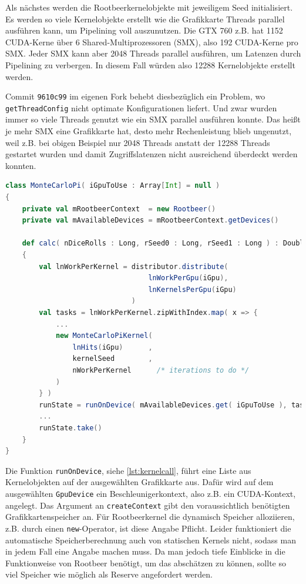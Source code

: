 Als nächstes werden die Rootbeerkernelobjekte mit jeweiligem Seed initialisiert. Es werden so viele Kernelobjekte erstellt wie die Grafikkarte Threads parallel ausführen kann, um Pipelining voll auszunutzen.
Die GTX 760 z.B. hat 1152 CUDA-Kerne über 6 Shared-Multiprozessoren (SMX), also 192 CUDA-Kerne pro SMX. Jeder SMX kann aber 2048 Threads parallel ausführen, um Latenzen durch Pipelining zu verbergen. In diesem Fall würden also 12288 Kernelobjekte erstellt werden.

Commit \lstinline!9610c99! im eigenen Fork behebt diesbezüglich ein Problem, wo \lstinline!getThreadConfig! nicht optimate Konfigurationen liefert. Und zwar wurden immer so viele Threads genutzt wie ein SMX parallel ausführen konnte. Das heißt je mehr SMX eine Grafikkarte hat, desto mehr Rechenleistung blieb ungenutzt, weil z.B. bei obigen Beispiel nur 2048 Threads anstatt der 12288 Threads gestartet wurden und damit Zugriffslatenzen nicht ausreichend überdeckt werden konnten.

\begin{lstlisting}[language=scala,caption={Initialisierung der Rootbeerkernelobjekte, vgl. auch \lstinline!multiNode/multiGpu/scala/MonteCarloPi.scala! \cite{scaromare}},label=lst:kernelinit]
class MonteCarloPi( iGpuToUse : Array[Int] = null )
{
    private val mRootbeerContext  = new Rootbeer()
    private val mAvailableDevices = mRootbeerContext.getDevices()

    def calc( nDiceRolls : Long, rSeed0 : Long, rSeed1 : Long ) : Double =
    {
        val lnWorkPerKernel = distributor.distribute(
                                  lnWorkPerGpu(iGpu),
                                  lnKernelsPerGpu(iGpu)
                              )
        val tasks = lnWorkPerKernel.zipWithIndex.map( x => {
            ...
            new MonteCarloPiKernel(
                lnHits(iGpu)      ,
                kernelSeed        ,
                nWorkPerKernel      /* iterations to do */
            )
        } )
        runState = runOnDevice( mAvailableDevices.get( iGpuToUse ), tasks )
        ...
        runState.take()
    }
}
\end{lstlisting}


Die Funktion \lstinline!runOnDevice!, siehe \autoref{lst:kernelcall}, führt eine Liste aus Kernelobjekten auf der ausgewählten Grafikkarte aus.
Dafür wird auf dem ausgewählten \lstinline!GpuDevice! ein Beschleunigerkontext, also z.B. ein CUDA-Kontext, angelegt. Das Argument an \lstinline!createContext! gibt den voraussichtlich benötigten Grafikkartenspeicher an. Für Rootbeerkernel die dynamisch Speicher alloziieren, z.B. durch einen \lstinline!new!-Operator, ist diese Angabe Pflicht. Leider funktioniert die automatische Speicherberechnung auch von statischen Kernels nicht, sodass man in jedem Fall eine Angabe machen muss. Da man jedoch tiefe Einblicke in die Funktionweise von Rootbeer benötigt, um das abschätzen zu können, sollte so viel Speicher wie möglich als Reserve angefordert werden.

